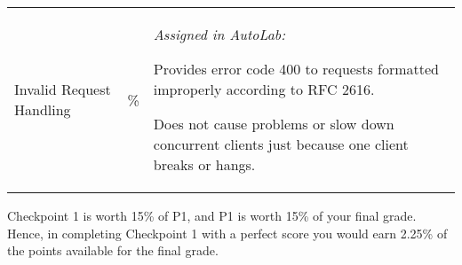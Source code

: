 \begin{center}
\begin{tabular}{>{\centering\arraybackslash}m{1in}>{\centering\arraybackslash}m{1in}p{3in}}
  \hline
  \addlinespace[5pt]

  Invalid Request Handling& 45\% & \vspace{-10pt} 
                              {\it Assigned in AutoLab:}
                              \begin{packed_itemize}
                                  \item Provides error code 400 to requests formatted improperly according to RFC 2616.

                                \item Does not cause problems or slow down concurrent clients just because one client breaks or hangs.
                              \end{packed_itemize}\\

\end{tabular}
\end{center}


\noindent Checkpoint 1 is worth 15\% of P1, and P1 is worth 15\% of your final grade. Hence, in completing Checkpoint 1 with a perfect score you would earn 2.25\% of the points available for the final grade.

